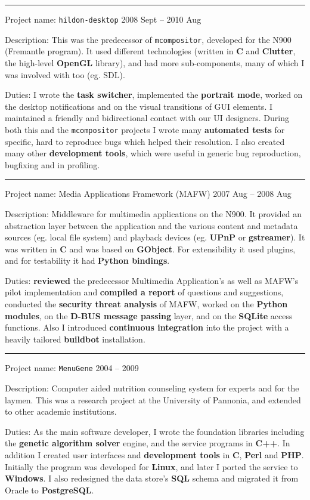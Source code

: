 \documentclass[a4paper,12pt]{article}
\newcommand\Yell{\textbf}
\newcommand\Label{\textsf}
\newcommand{\midline}{\rule[0.5ex]{\linewidth-\parindent}{.5pt}}
\begin{document}
\midline\par
\Label{Project name}: \texttt{hildon-desktop}\hfill
\Label{2008 Sept -- 2010 Aug}\par
\Label{Description}: This was the predecessor of \texttt{mcompositor},
developed for the N900 (Fremantle program).  It used different technologies
(written in \Yell{C} and \Yell{Clutter}, the high-level \Yell{OpenGL}
library), and had more sub-components, many of which I was involved with
too (eg. SDL).\par
\Label{Duties}: I wrote the \Yell{task switcher}, implemented the
\Yell{portrait mode}, worked on the desktop notifications and on
the visual transitions of GUI elements.  I maintained a friendly and
bidirectional contact with our UI designers.  During both this and
the \texttt{mcompositor} projects I wrote many \Yell{automated tests}
for specific, hard to reproduce bugs which helped their resolution.
I also created many other \Yell{development tools}, which were useful
in generic bug reproduction, bugfixing and in profiling.

\newpage
\midline\par
\Label{Project name}: Media Applications Framework (MAFW)\hfill
\Label{2007 Aug -- 2008 Aug}\par
\Label{Description}: Middleware for multimedia applications on the N900.
It provided an abstraction layer between the application and the various
content and metadata sources (eg. local file system) and playback devices
(eg. \Yell{UPnP} or \Yell{gstreamer}).  It was written in \Yell{C} and was
based on \Yell{GObject}.  For extensibility it used plugins, and for
testability it had \Yell{Python bindings}.\par
\Label{Duties}: \Yell{reviewed} the predecessor Multimedia Application's
as well as MAFW's pilot implementation and \Yell{compiled a report} of
questions and suggestions, conducted the \Yell{security threat analysis}
of MAFW, worked on the \Yell{Python modules}, on the \Yell{D-BUS message
passing} layer, and on the \Yell{SQLite} access functions.  Also I introduced
\Yell{continuous integration} into the project with a heavily tailored
\Yell{buildbot} installation.

\midline\par
\Label{Project name}: \texttt{MenuGene}\hfill
\Label{2004 -- 2009}\par
\Label{Description}: Computer aided nutrition counseling system for
experts and for the laymen.  This was a research project at the University
of Pannonia, and extended to other academic institutions.\par
\Label{Duties}: As the main software developer, I wrote the foundation
libraries including the \Yell{genetic algorithm solver} engine, and the
service programs in \Yell{C++}.  In addition I created user interfaces
and \Yell{development tools} in \Yell{C}, \Yell{Perl} and \Yell{PHP}.
Initially the program was developed for \Yell{Linux}, and later I ported
the service to \Yell{Windows}.  I also redesigned the data store's \Yell{SQL}
schema and migrated it from Oracle to \Yell{PostgreSQL}.
\end{document}
